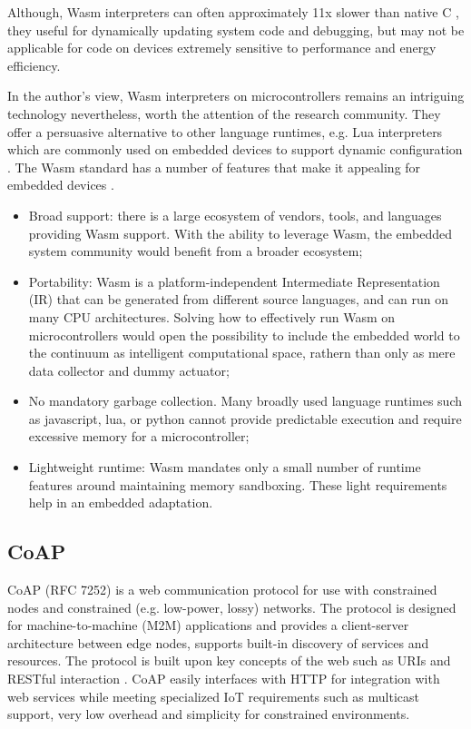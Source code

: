 \documentclass{ieeeaccess}
\begin{document}
Although, Wasm interpreters can often approximately 11x slower than native C \cite{wasm3-performance}, they useful for dynamically updating system code and debugging, but may not be applicable for code on devices extremely sensitive to performance and energy efficiency. 

In the author's view, Wasm interpreters on microcontrollers remains an intriguing technology nevertheless, worth the attention of the research community. They offer a persuasive alternative to other language runtimes, e.g. Lua interpreters which are commonly used on embedded devices to support dynamic configuration \cite{levee}. The Wasm standard has a number of features that make it appealing for embedded devices \cite{ewasm}.

\begin{itemize}
    \item Broad support: there is a large ecosystem of vendors, tools, and languages providing Wasm support. With the ability to leverage Wasm, the embedded system community would benefit from a broader ecosystem;
    \item Portability: Wasm is a platform-independent Intermediate Representation (IR) that can be generated from different source languages, and can run on many CPU architectures. Solving how to effectively run Wasm on microcontrollers would open the possibility to include the embedded world to the continuum as intelligent computational space, rathern than only as mere data collector and dummy actuator;
    \item No mandatory garbage collection. Many broadly used language runtimes such as javascript, lua, or python cannot provide predictable execution and require excessive memory for a microcontroller;
    \item Lightweight runtime: Wasm mandates only a small number of runtime features around maintaining memory sandboxing. These light requirements help in an embedded adaptation.
\end{itemize}

\subsection{CoAP}
\label{sec:coap}

CoAP \cite{coap} (RFC 7252) is a web communication protocol for use with constrained nodes and constrained (e.g. low-power, lossy) networks. The protocol is designed for machine-to-machine (M2M) applications and provides a client-server architecture between edge nodes, supports built-in discovery of services and resources. The protocol is built upon key concepts of the web such as URIs and RESTful interaction \cite{coap-soa}. CoAP easily interfaces with HTTP for integration with web services while meeting specialized IoT requirements such as multicast support, very low overhead and simplicity for constrained environments. 
\end{document}
